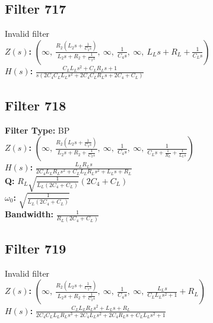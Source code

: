 \documentclass{article}
\begin{document}
\subsection*{Filter 717}
Invalid filter \\ 
\textbf{$Z(s)$:} $\left( \infty, \  \frac{R_{2} \left(L_{2} s + \frac{1}{C_{2} s}\right)}{L_{2} s + R_{2} + \frac{1}{C_{2} s}}, \  \infty, \  \frac{1}{C_{4} s}, \  \infty, \  L_{L} s + R_{L} + \frac{1}{C_{L} s}\right)$ \\ 
\textbf{$H(s)$:} $\frac{C_{L} L_{L} s^{2} + C_{L} R_{L} s + 1}{s \left(2 C_{4} C_{L} L_{L} s^{2} + 2 C_{4} C_{L} R_{L} s + 2 C_{4} + C_{L}\right)}$ \\ 
\subsection*{Filter 718}
\textbf{Filter Type:} BP \\ 
\textbf{$Z(s)$:} $\left( \infty, \  \frac{R_{2} \left(L_{2} s + \frac{1}{C_{2} s}\right)}{L_{2} s + R_{2} + \frac{1}{C_{2} s}}, \  \infty, \  \frac{1}{C_{4} s}, \  \infty, \  \frac{1}{C_{L} s + \frac{1}{R_{L}} + \frac{1}{L_{L} s}}\right)$ \\ 
\textbf{$H(s)$:} $\frac{L_{L} R_{L} s}{2 C_{4} L_{L} R_{L} s^{2} + C_{L} L_{L} R_{L} s^{2} + L_{L} s + R_{L}}$ \\ 
\textbf{Q:} $R_{L} \sqrt{\frac{1}{L_{L} \left(2 C_{4} + C_{L}\right)}} \left(2 C_{4} + C_{L}\right)$ \\ 
\textbf{$\omega_0$:} $\sqrt{\frac{1}{L_{L} \left(2 C_{4} + C_{L}\right)}}$ \\ 
\textbf{Bandwidth:} $\frac{1}{R_{L} \left(2 C_{4} + C_{L}\right)}$ \\ 
\subsection*{Filter 719}
Invalid filter \\ 
\textbf{$Z(s)$:} $\left( \infty, \  \frac{R_{2} \left(L_{2} s + \frac{1}{C_{2} s}\right)}{L_{2} s + R_{2} + \frac{1}{C_{2} s}}, \  \infty, \  \frac{1}{C_{4} s}, \  \infty, \  \frac{L_{L} s}{C_{L} L_{L} s^{2} + 1} + R_{L}\right)$ \\ 
\textbf{$H(s)$:} $\frac{C_{L} L_{L} R_{L} s^{2} + L_{L} s + R_{L}}{2 C_{4} C_{L} L_{L} R_{L} s^{3} + 2 C_{4} L_{L} s^{2} + 2 C_{4} R_{L} s + C_{L} L_{L} s^{2} + 1}$ \\ 
\end{document}
